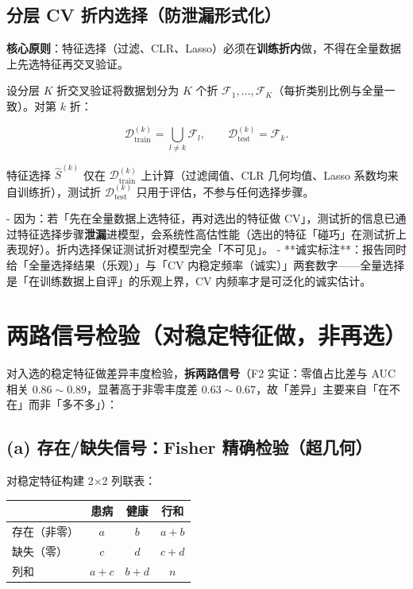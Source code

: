 \documentclass{internal-report}
\begin{document}
\subsection{分层 CV 折内选择（防泄漏形式化）}
\label{sec:leakage}

\textbf{核心原则}：特征选择（过滤、CLR、Lasso）必须在\textbf{训练折内}做，不得在全量数据上先选特征再交叉验证。

设分层 $K$ 折交叉验证将数据划分为 $K$ 个折 $\mathcal{F}_1,\dots,\mathcal{F}_K$（每折类别比例与全量一致）。对第 $k$ 折：

\begin{equation}
  \mathcal{D}_{\text{train}}^{(k)} = \bigcup_{l\neq k}\mathcal{F}_l,
  \qquad
  \mathcal{D}_{\text{test}}^{(k)} = \mathcal{F}_k.
  \label{eq:fold}
\end{equation}

特征选择 $\hat{S}^{(k)}$ 仅在 $\mathcal{D}_{\text{train}}^{(k)}$ 上计算（过滤阈值、CLR 几何均值、Lasso 系数均来自训练折），测试折 $\mathcal{D}_{\text{test}}^{(k)}$ 只用于评估，不参与任何选择步骤。

- 因为：若「先在全量数据上选特征，再对选出的特征做 CV」，测试折的信息已通过特征选择步骤\textbf{泄漏}进模型，会系统性高估性能（选出的特征「碰巧」在测试折上表现好）。折内选择保证测试折对模型完全「不可见」。
- **诚实标注**：报告同时给「全量选择结果（乐观）」与「CV 内稳定频率（诚实）」两套数字——全量选择是「在训练数据上自评」的乐观上界，CV 内频率才是可泛化的诚实估计。

\section{两路信号检验（对稳定特征做，非再选）}
\label{sec:twopath}

对入选的稳定特征做差异丰度检验，\textbf{拆两路信号}（F2 实证：零值占比差与 AUC 相关 $0.86\sim0.89$，显著高于非零丰度差 $0.63\sim0.67$，故「差异」主要来自「在不在」而非「多不多」）：

\subsection{(a) 存在/缺失信号：Fisher 精确检验（超几何）}
\label{sec:fisher}

对稳定特征构建 2$\times$2 列联表：

\begin{center}
\begin{tabular}{lccc}
\toprule
 & 患病 & 健康 & 行和 \\
\midrule
存在（非零） & $a$ & $b$ & $a+b$ \\
缺失（零） & $c$ & $d$ & $c+d$ \\
\midrule
列和 & $a+c$ & $b+d$ & $n$ \\
\bottomrule
\end{tabular}
\end{center}
\end{document}

